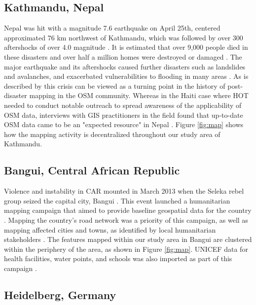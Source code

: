 \subsection{Kathmandu, Nepal}

Nepal was hit with a magnitude 7.6 earthquake on April 25th, centered approximated 76 km northwest of Kathmandu, which was followed by over 300 aftershocks of over 4.0 magnitude \parencite{noauthor_nepal_2015}. It is estimated that over 9,000 people died in these disasters and over half a million homes were destroyed or damaged \parencite{noauthor_nepal_2015}. The major earthquake and its aftershocks caused further disasters such as landslides and avalanches, and exacerbated vulnerabilities to flooding in many areas \parencite{noauthor_nepal_2015}. As is described by \textcite{soden_infrastructure_2016} this crisis can be viewed as a turning point in the history of post-disaster mapping in the OSM community. Whereas in the Haiti case where HOT needed to conduct notable outreach to spread awareness of the applicability of OSM data, interviews with GIS practitioners in the field found that up-to-date OSM data came to be an "expected resource" in Nepal \parencite[p. 2801]{soden_infrastructure_2016}. Figure \ref{fig:map} shows how the mapping activity is decentralized throughout our study area of Kathmandu.

\subsection{Bangui, Central African Republic}

Violence and instability in CAR mounted in March 2013 when the Seleka rebel group seized the capital city, Bangui \parencite{global_conflict_tracker_violence_2020}. This event launched a humanitarian mapping campaign that aimed to provide baseline geospatial data for the country \parencite{openstreetmap_wiki_wikiproject_2020}. Mapping the country's road network was a priority of this campaign, as well as mapping affected cities and towns, as identified by local humanitarian stakeholders \parencite{openstreetmap_wiki_wikiproject_2020}. The features mapped within our study area in Bangui are clustered within the periphery of the area, as shown in Figure \ref{fig:map}. UNICEF data for health facilities, water points, and schools was also imported as part of this campaign \parencite{openstreetmap_wiki_wikiproject_2020}.

\subsection{Heidelberg, Germany}

